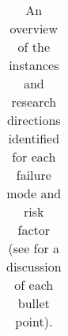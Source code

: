 \begin{table}[htp]
\begin{tabularx}{\linewidth}{>{\raggedright\arraybackslash}p{2.5cm} >{\raggedright\arraybackslash}p{4.5cm} >{\raggedright\arraybackslash}p{8cm}}
        {$\bullet$ Secure Interaction Protocols \newline $\bullet$ Monitoring and Threat Detection \newline $\bullet$ Multi-Agent Adversarial Testing \newline $\bullet$ Sociotechnical Security Defences \newline \pa \newline \pa} \\
        \bottomrule
    \end{tabularx}
    \caption{An overview of the instances and research directions identified for each failure mode and risk factor (see  for a discussion of each bullet point).}
    \label{tab:risks}
\end{table}

